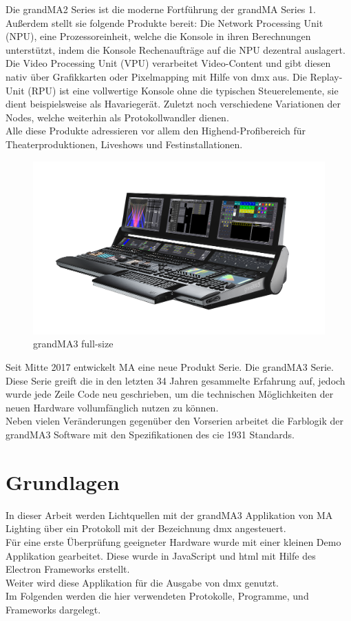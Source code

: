 \documentclass[11pt]{scrartcl}
\begin{document}
\noindent
Die grandMA2 Series ist die moderne Fortführung der grandMA Series 1. Außerdem stellt sie
folgende Produkte bereit: Die Network Processing Unit (NPU), eine Prozessoreinheit, welche die
Konsole in ihren Berechnungen unterstützt, indem die Konsole Rechenaufträge auf die NPU dezentral
auslagert. Die Video Processing Unit (VPU) verarbeitet Video-Content und gibt diesen nativ über
Grafikkarten oder Pixelmapping mit Hilfe von \ac{dmx} aus. Die Replay-Unit (RPU) ist eine vollwertige
Konsole ohne die typischen Steuerelemente, sie dient beispielsweise als Havariegerät. Zuletzt noch
verschiedene Variationen der Nodes, welche weiterhin als Protokollwandler dienen.\\
Alle diese Produkte adressieren vor allem den Highend-Profibereich für Theaterproduktionen,
Liveshows und Festinstallationen.\\
\begin{figure}[H]
    \includegraphics[width=\textwidth]{images/grandMA3-full-size.png}
    \caption{grandMA3 full-size \cite{gma3}}\label{fig:gma3}
\end{figure}
\noindent
Seit Mitte 2017 entwickelt MA eine neue Produkt Serie. Die grandMA3 Serie. Diese Serie greift die
in den letzten 34 Jahren gesammelte Erfahrung auf, jedoch wurde jede Zeile Code neu geschrieben,
um die technischen Möglichkeiten der neuen Hardware vollumfänglich nutzen zu können.\\
Neben vielen Veränderungen gegenüber den Vorserien arbeitet die Farblogik der grandMA3 Software
mit den Spezifikationen des \ac{cie} 1931 Standards.
\clearpage

\section{Grundlagen}
In dieser Arbeit werden Lichtquellen mit der grandMA3 Applikation von MA Lighting über ein Protokoll
mit der Bezeichnung \ac{dmx} angesteuert.\\
Für eine erste Überprüfung geeigneter Hardware wurde mit einer kleinen Demo Applikation gearbeitet. Diese wurde
in JavaScript und \ac{html} mit Hilfe des Electron Frameworks erstellt.\\
Weiter wird diese Applikation für die Ausgabe von \ac{dmx} genutzt.\\
Im Folgenden werden die hier verwendeten Protokolle, Programme, und Frameworks dargelegt.
\end{document}
